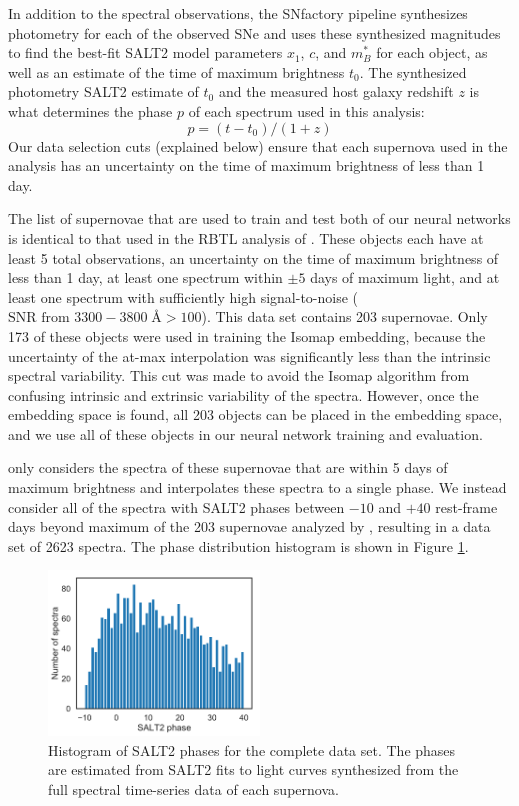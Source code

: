 In addition to the spectral observations, the SNfactory pipeline synthesizes photometry for each of the observed SNe and uses these synthesized magnitudes to find the best-fit SALT2 model parameters $x_1$, $c$, and $m_B^*$ for each object, as well as an estimate of the time of maximum brightness $t_0$. The synthesized photometry SALT2 estimate of $t_0$ and the measured host galaxy redshift $z$ is what determines the phase $p$ of each spectrum used in this analysis:
\begin{equation}
    p = (t - t_0)/(1 + z)
\end{equation}
Our data selection cuts (explained below) ensure that each supernova used in the analysis has an uncertainty on the time of maximum brightness of less than 1 day.

The list of supernovae that are used to train and test both of our neural networks is identical to that used in the RBTL analysis of . These objects each have at least 5 total observations, an uncertainty on the time of maximum brightness of less than 1 day, at least one spectrum within $\pm 5$ days of maximum light, and at least one spectrum with sufficiently high signal-to-noise ($\text{SNR from }3300-3800\;\text{\AA} > 100$). This data set contains 203 supernovae. Only 173 of these objects were used in training the Isomap embedding, because the uncertainty of the at-max interpolation was significantly less than the intrinsic spectral variability. This cut was made to avoid the Isomap algorithm from confusing intrinsic and extrinsic variability of the spectra. However, once the embedding space is found, all 203 objects can be placed in the embedding space, and we use all of these objects in our neural network training and evaluation.

 only considers the spectra of these supernovae that are within 5 days of maximum brightness and interpolates these spectra to a single phase. We instead consider all of the spectra with SALT2 phases between $-10$ and $+40$ rest-frame days beyond maximum of the 203 supernovae analyzed by \cite{boone_twins_2020a}, resulting in a data set of 2623 spectra. The phase distribution histogram is shown in Figure \ref{fig:phase_distribution}.

\begin{figure}[ht]
    \centering
    \includegraphics[width=0.5\textwidth]{figures/nn_twins/phase_histogram.pdf}
    \caption{Histogram of SALT2 phases for the complete data set. The phases are estimated from SALT2 fits to light curves synthesized from the full spectral time-series data of each supernova.}
    \label{fig:phase_distribution}
\end{figure}

